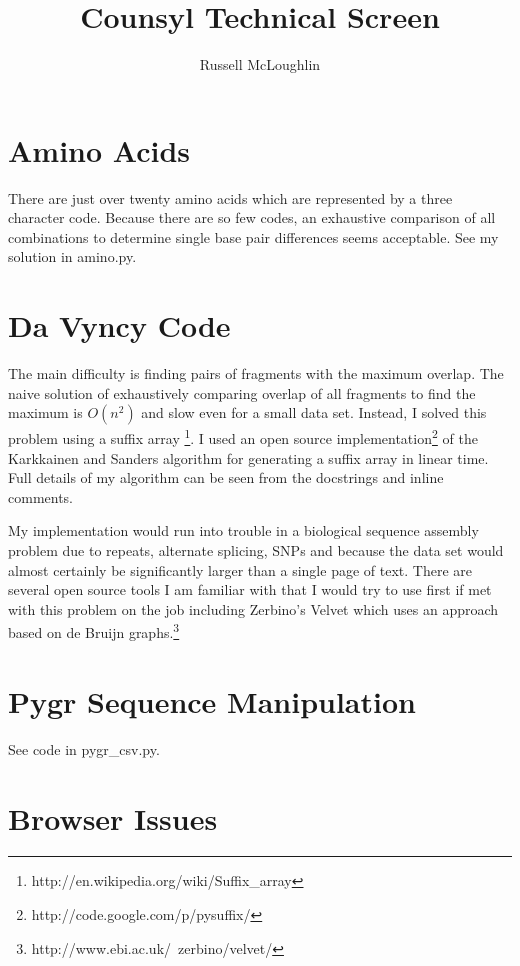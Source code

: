 \documentclass[12pt]{amsart}
\title{Counsyl Technical Screen}
\author{Russell McLoughlin}
\begin{document}
\maketitle

\section{Amino Acids}

There are just over twenty amino acids which are represented by a three character code. Because there are so few codes, an exhaustive comparison of all combinations to determine single base pair differences seems acceptable. See my solution in amino.py.

\section{Da Vyncy Code}

The main difficulty is finding pairs of fragments with the maximum overlap. The naive solution of exhaustively comparing overlap of all fragments to find the maximum is $O(n^2)$ and slow even for a small data set. Instead, I solved this problem using a suffix array \footnote[1]{http://en.wikipedia.org/wiki/Suffix\_array}. I used an open source implementation\footnote[2]{http://code.google.com/p/pysuffix/} of the Karkkainen and Sanders algorithm for generating a suffix array in linear time. Full details of my algorithm can be seen from the docstrings and inline comments. 

My implementation would run into trouble in a biological sequence assembly problem due to repeats, alternate splicing, SNPs and because the data set would almost certainly be significantly larger than a single page of text. There are several open source tools I am familiar with that I would try to use first if met with this problem on the job including Zerbino's Velvet which uses an approach based on de Bruijn graphs.\footnote[3]{http://www.ebi.ac.uk/~zerbino/velvet/}

\section{Pygr Sequence Manipulation}

See code in pygr\_csv.py.

\section{Browser Issues}
\end{document}
